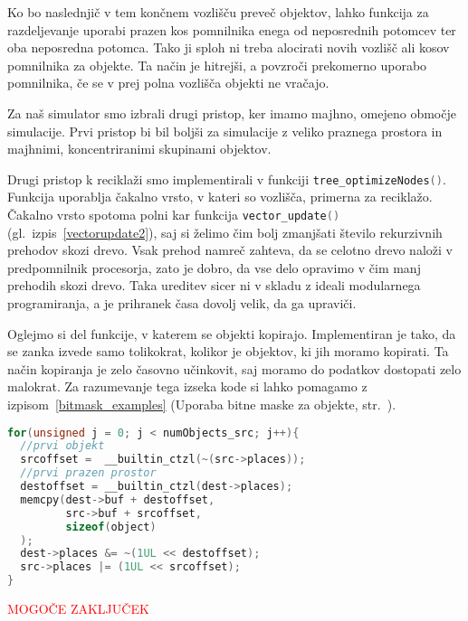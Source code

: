 \documentclass[a4paper,12pt]{article}
\begin{document}
Ko bo naslednjič v tem končnem vozlišču preveč objektov, lahko funkcija za razdeljevanje uporabi prazen kos pomnilnika enega
od neposrednih potomcev ter oba neposredna potomca. Tako ji sploh ni treba alocirati novih vozlišč ali kosov pomnilnika za objekte.
Ta način je hitrejši, a povzroči prekomerno uporabo pomnilnika, če se v prej polna vozlišča objekti ne vračajo.

Za naš simulator smo izbrali drugi pristop, ker imamo majhno, omejeno območje simulacije. Prvi pristop bi bil
boljši za simulacije z veliko praznega prostora in majhnimi, koncentriranimi skupinami objektov.

Drugi pristop k reciklaži smo implementirali v funkciji \lstinline[language=C]{tree_optimizeNodes()}.
Funkcija uporablja čakalno vrsto, v kateri so vozlišča, primerna za reciklažo. Čakalno vrsto spotoma polni
kar funkcija \lstinline[language=C]{vector_update()} (gl.\ izpis~\ref{vectorupdate2}),
saj si želimo čim bolj zmanjšati število rekurzivnih prehodov skozi drevo.
Vsak prehod namreč zahteva, da se celotno drevo naloži v predpomnilnik procesorja, zato je dobro, da vse delo
opravimo v čim manj prehodih skozi drevo. Taka ureditev sicer ni v skladu z ideali modularnega programiranja,
a je prihranek časa dovolj velik, da ga upraviči.

Oglejmo si del funkcije, v katerem se objekti kopirajo. Implementiran je tako, da se zanka izvede samo tolikokrat,
kolikor je objektov, ki jih moramo kopirati. Ta način kopiranja je zelo časovno učinkovit, saj moramo do podatkov
dostopati zelo malokrat. Za razumevanje tega izseka kode si lahko pomagamo z izpisom~\ref{bitmask_examples}
(Uporaba bitne maske za objekte, str.\ \pageref{bitmask_examples}).
\begin{lstlisting}[caption={tree\_optimizeNodes() -- Kopiranje objektov}, label=optimizenodes, language=C]
for(unsigned j = 0; j < numObjects_src; j++){
  //prvi objekt
  srcoffset =  __builtin_ctzl(~(src->places));
  //prvi prazen prostor
  destoffset = __builtin_ctzl(dest->places);
  memcpy(dest->buf + destoffset,
         src->buf + srcoffset,
         sizeof(object)
  );
  dest->places &= ~(1UL << destoffset);
  src->places |= (1UL << srcoffset);
}
\end{lstlisting}

\textcolor{red}{MOGOČE ZAKLJUČEK}
\newpage
\end{document}
